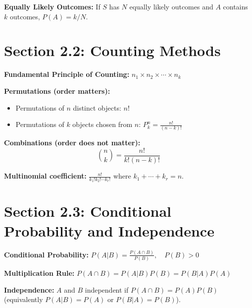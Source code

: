 \documentclass[11pt]{article}
\begin{document}
\textbf{Equally Likely Outcomes:} If \(S\) has \(N\) equally likely outcomes and \(A\) contains \(k\) outcomes, \(P(A) = k/N\).

\section*{Section 2.2: Counting Methods}
\textbf{Fundamental Principle of Counting:} \(n_1 \times n_2 \times \cdots \times n_k\)

\textbf{Permutations (order matters):}
\begin{itemize}[nosep]
    \item Permutations of \(n\) distinct objects: \(n!\)
    \item Permutations of \(k\) objects chosen from \(n\): \(P^n_k = \frac{n!}{(n-k)!}\)
\end{itemize}

\textbf{Combinations (order does not matter):}
\[
\binom{n}{k} = \frac{n!}{k!(n-k)!}
\]

\textbf{Multinomial coefficient:} \(\frac{n!}{k_1!k_2!\cdots k_r!}\) where \(k_1+\cdots+k_r=n\).

\section*{Section 2.3: Conditional Probability and Independence}
\textbf{Conditional Probability:} \(P(A|B) = \frac{P(A \cap B)}{P(B)},\quad P(B)>0\)

\begin{center}
\end{center}

\textbf{Multiplication Rule:} \(P(A \cap B) = P(A|B)P(B) = P(B|A)P(A)\)

\textbf{Independence:} \(A\) and \(B\) independent if \(P(A \cap B) = P(A)P(B)\) (equivalently \(P(A|B)=P(A)\) or \(P(B|A)=P(B)\)).
\end{document}
